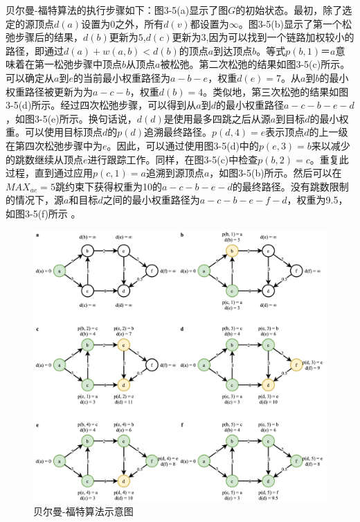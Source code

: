 贝尔曼-福特算法的执行步骤如下：图3-5(a)显示了图$G$的初始状态。最初，除了选定的源顶点$d(a)$设置为$0$之外，所有$d(v)$都设置为$\infty$。图3-5(b)显示了第一个松弛步骤后的结果，$d(b)$更新为$5$,$d(c)$更新为$3$,因为可以找到一个链路加权较小的路径，即通过$d(a)+w(a,b)<d(b)$的顶点$a$到达顶点$b$。等式$p(b,1)＝a$意味着在第一松弛步骤中顶点$b$从顶点$a$被松弛。第二次松弛的结果如图3-5(c)所示。可以确定从$a$到$e$的当前最小权重路径为${a-b-e}$，权重$d(e)=7$。从$a$到$b$的最小权重路径被更新为为${a-c-b}$，权重$d(b)=4$。类似地，第三次松弛的结果如图3-5(d)所示。经过四次松弛步骤，可以得到从$a$到$d$的最小权重路径${a-c-b-e-d}$，如图3-5(e)所示。换句话说，$d(d)$是使用最多四跳之后从源$a$到目标$d$的最小权重。可以使用目标顶点$d$的$p(d)$追溯最终路径。$p(d,4)=e$表示顶点$d$的上一级在第四次松弛步骤中为$e$。因此，可以通过使用图3-5(d)中的$p(e,3)=b$来以减少的跳数继续从顶点$e$进行跟踪工作。同样，在图3-5(c)中检查$p(b,2)=c$。重复此过程，直到通过应用$p(c,1)=a$追溯到源顶点$a$，如图3-5(b)所示。然后可以在${MAX}_{ae}=5$跳约束下获得权重为10的${a-c-b-e-d}$的最终路径。没有跳数限制的情况下，源$a$和目标$d$之间的最小权重路径为${a-c-b-e-f-d}$，权重为9.5，如图3-5(f)所示 \cite{BFOPTI} 。

\begin{figure}[htbp]
\setlength{\abovecaptionskip}{15pt plus 3pt minus 2pt}
\centerline{\includegraphics[width=1\textwidth]{./figures/ch3-bf.png}}
\caption{贝尔曼-福特算法示意图}
\label{fig-ch3-bf}
\end{figure}

